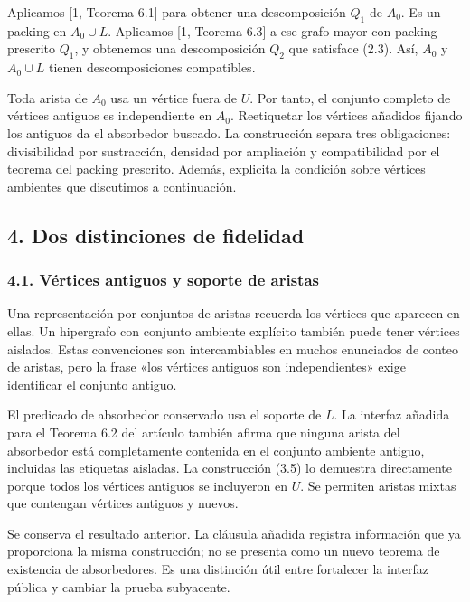 \documentclass[spanish,11pt,a4paper]{article}
\begin{document}
Aplicamos {[}1, Teorema 6.1{]} para obtener una descomposición \(Q_1\) de \(A_0\). Es un packing en \(A_0\cup L\). Aplicamos {[}1, Teorema 6.3{]} a ese grafo mayor con packing prescrito \(Q_1\), y obtenemos una descomposición \(Q_2\) que satisface (2.3). Así, \(A_0\) y \(A_0\cup L\) tienen descomposiciones compatibles.

Toda arista de \(A_0\) usa un vértice fuera de \(U\). Por tanto, el conjunto completo de vértices antiguos es independiente en \(A_0\). Reetiquetar los vértices añadidos fijando los antiguos da el absorbedor buscado. La construcción separa tres obligaciones: divisibilidad por sustracción, densidad por ampliación y compatibilidad por el teorema del packing prescrito. Además, explicita la condición sobre vértices ambientes que discutimos a continuación.

\subsection{4. Dos distinciones de fidelidad}\label{dos-distinciones-de-fidelidad}


\subsubsection{4.1. Vértices antiguos y soporte de aristas}\label{vuxe9rtices-antiguos-y-soporte-de-aristas}

Una representación por conjuntos de aristas recuerda los vértices que aparecen en ellas. Un hipergrafo con conjunto ambiente explícito también puede tener vértices aislados. Estas convenciones son intercambiables en muchos enunciados de conteo de aristas, pero la frase «los vértices antiguos son independientes» exige identificar el conjunto antiguo.

El predicado de absorbedor conservado usa el soporte de \(L\). La interfaz añadida para el Teorema 6.2 del artículo también afirma que ninguna arista del absorbedor está completamente contenida en el conjunto ambiente antiguo, incluidas las etiquetas aisladas. La construcción (3.5) lo demuestra directamente porque todos los vértices antiguos se incluyeron en \(U\). Se permiten aristas mixtas que contengan vértices antiguos y nuevos.

Se conserva el resultado anterior. La cláusula añadida registra información que ya proporciona la misma construcción; no se presenta como un nuevo teorema de existencia de absorbedores. Es una distinción útil entre fortalecer la interfaz pública y cambiar la prueba subyacente.
\end{document}
